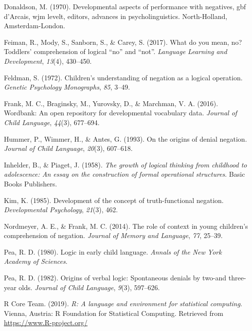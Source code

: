\documentclass[man,floatsintext]{apa6}
\begin{document}
\leavevmode\hypertarget{ref-donaldson1970developmental}{}%
Donaldson, M. (1970). Developmental aspects of performance with negatives, gbf d'Arcais, wjm levelt, editors, advances in psycholinguistics. North-Holland, Amsterdam-London.

\leavevmode\hypertarget{ref-feiman2017nonot}{}%
Feiman, R., Mody, S., Sanborn, S., \& Carey, S. (2017). What do you mean, no? Toddlers' comprehension of logical ``no'' and ``not''. \emph{Language Learning and Development}, \emph{13}(4), 430--450.

\leavevmode\hypertarget{ref-feldman1972}{}%
Feldman, S. (1972). Children's understanding of negation as a logical operation. \emph{Genetic Psychology Monographs}, \emph{85}, 3--49.

\leavevmode\hypertarget{ref-frank2016wordbank}{}%
Frank, M. C., Braginsky, M., Yurovsky, D., \& Marchman, V. A. (2016). Wordbank: An open repository for developmental vocabulary data. \emph{Journal of Child Language}, \emph{44}(3), 677--694.

\leavevmode\hypertarget{ref-hummer1993origins}{}%
Hummer, P., Wimmer, H., \& Antes, G. (1993). On the origins of denial negation. \emph{Journal of Child Language}, \emph{20}(3), 607--618.

\leavevmode\hypertarget{ref-inhelder1958growth}{}%
Inhelder, B., \& Piaget, J. (1958). \emph{The growth of logical thinking from childhood to adolescence: An essay on the construction of formal operational structures}. Basic Books Publishers.

\leavevmode\hypertarget{ref-kim1985development}{}%
Kim, K. (1985). Development of the concept of truth-functional negation. \emph{Developmental Psychology}, \emph{21}(3), 462.

\leavevmode\hypertarget{ref-nordmeyer2014negation}{}%
Nordmeyer, A. E., \& Frank, M. C. (2014). The role of context in young children's comprehension of negation. \emph{Journal of Memory and Language}, \emph{77}, 25--39.

\leavevmode\hypertarget{ref-pea1980logic}{}%
Pea, R. D. (1980). Logic in early child language. \emph{Annals of the New York Academy of Sciences}.

\leavevmode\hypertarget{ref-pea1982origins}{}%
Pea, R. D. (1982). Origins of verbal logic: Spontaneous denials by two-and three-year olds. \emph{Journal of Child Language}, \emph{9}(3), 597--626.

\leavevmode\hypertarget{ref-R-base}{}%
R Core Team. (2019). \emph{R: A language and environment for statistical computing}. Vienna, Austria: R Foundation for Statistical Computing. Retrieved from \url{https://www.R-project.org/}
\end{document}
